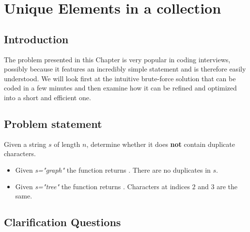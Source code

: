 %


\chapter{Unique Elements in a collection}
\label{ch:unique_elements}
\section*{Introduction}
The problem presented in this Chapter is very popular in coding interviews, 
possibly because it features an incredibly simple statement and is therefore easily understood.
We will look first at the intuitive brute-force solution that can be coded in a few minutes and then examine how it 
can be refined and optimized into a short and efficient one. 

\section{Problem statement}
\begin{exercise}
Given a string $s$ of length $n$, determine whether it does \textbf{not} contain duplicate characters. 

\begin{example}
\hfill
	\begin{itemize}
		\item Given \textit{s="graph"} the function returns . There are no duplicates  in $s$.
		\item Given \textit{s="tree"} the function returns . Characters at indices $2$ and $3$  are the same.
	\end{itemize}
\end{example}

\end{exercise}

\section{Clarification Questions}

